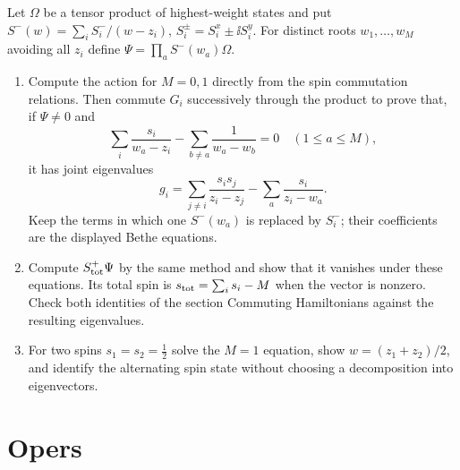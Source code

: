 \begin{exercise}
Let $\Omega$ be a tensor product of highest-weight states and put
$S^-(w)=\sum_iS_i^-/(w-z_i)$,
$S_i^\pm=S_i^x\pm\ii S_i^y$.
For distinct roots $w_1,\dots,w_M$ avoiding all $z_i$ define
$\Psi=\prod_aS^-(w_a)\Omega$.
\begin{enumerate}[label=(\alph*)]
\item Compute the action for $M=0,1$ directly from the spin
commutation relations. Then commute $G_i$ successively through
the product to prove that, if $\Psi\ne0$ and
\[
 \sum_i\frac{s_i}{w_a-z_i}
       -\sum_{b\ne a}\frac1{w_a-w_b}=0
       \quad(1\le a\le M),
\]
it has joint eigenvalues
\[
 g_i=\sum_{j\ne i}\frac{s_i s_j}{z_i-z_j}
           -\sum_a\frac{s_i}{z_i-w_a}.
\]
Keep the terms in which one $S^-(w_a)$ is replaced by $S_i^-$;
their coefficients are the displayed Bethe equations.
\item Compute $S^+_{\rm tot}\Psi$ by the same method and show
that it vanishes under these equations. Its total spin is
$s_{\rm tot}=\sum_i s_i-M$ when the vector is nonzero.
Check both identities of the section Commuting Hamiltonians
against the resulting eigenvalues.
\item For two spins $s_1=s_2=\tfrac12$ solve the $M=1$
equation, show $w=(z_1+z_2)/2$, and identify the alternating
spin state without choosing a decomposition into eigenvectors.
\end{enumerate}
\end{exercise}

\section{Opers}

